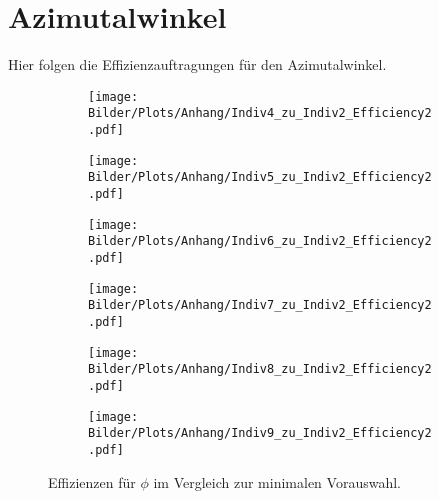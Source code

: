 \section{Azimutalwinkel}\label{phi}%
Hier folgen die Effizienzauftragungen für den Azimutalwinkel.
\clearpage
\begin{figure}
  \begin{subfigure}[t]{0.5\textwidth}
  \texttt{[image: Bilder/Plots/Anhang/Indiv4\_zu\_Indiv2\_Efficiency2.pdf]}
  \end{subfigure}
\begin{subfigure}[t]{0.5\textwidth}
 \texttt{[image: Bilder/Plots/Anhang/Indiv5\_zu\_Indiv2\_Efficiency2.pdf]}
\end{subfigure}
\begin{subfigure}[t]{0.5\textwidth}
  \texttt{[image: Bilder/Plots/Anhang/Indiv6\_zu\_Indiv2\_Efficiency2.pdf]}
\end{subfigure}
\begin{subfigure}[t]{0.5\textwidth}
  \texttt{[image: Bilder/Plots/Anhang/Indiv7\_zu\_Indiv2\_Efficiency2.pdf]}
\end{subfigure}
\begin{subfigure}[t]{0.5\textwidth}
  \texttt{[image: Bilder/Plots/Anhang/Indiv8\_zu\_Indiv2\_Efficiency2.pdf]}
\end{subfigure}
\begin{subfigure}[t]{0.5\textwidth}
  \texttt{[image: Bilder/Plots/Anhang/Indiv9\_zu\_Indiv2\_Efficiency2.pdf]}
\end{subfigure}
\caption{Effizienzen für $\phi$ im Vergleich zur minimalen Vorauswahl.}
\end{figure}
\clearpage
